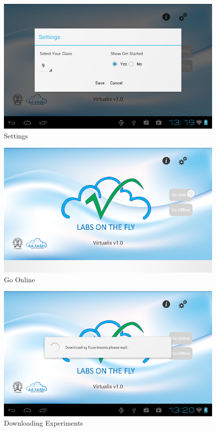 \documentclass[12pt]{report}
\begin{document}
\begin{figure}[H]
 \centering
 \includegraphics[width=15cm]{./8.png}
 \caption{Settings \label{fig:8}}
\end{figure}

\begin{figure}[H]
 \centering
 \includegraphics[width=15cm]{./11.png}
 \caption{Go Online\label{fig:11}}
\end{figure}

\begin{figure}[H]
 \centering
 \includegraphics[width=15cm]{./12.png}
 \caption{Downloading Experiments\label{fig:12}}
\end{figure}
\end{document}
